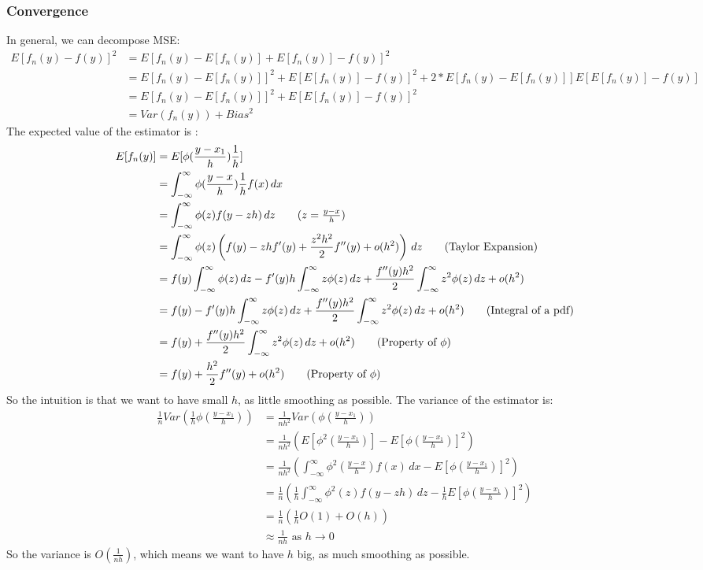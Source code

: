 \subsubsection{Convergence}
In general, we can decompose MSE: 
    \begin{align*}
        E[f_n(y) - f(y)]^2 
        & = E\left[f_n(y) - E[f_n(y)] + E[f_n(y)] - f(y)\right]^2 \\
        & = E[f_n(y) - E[f_n(y)]]^2 + E[E[f_n(y)] - f(y)]^2 + 2 * E[f_n(y) - E[f_n(y)]] E[E[f_n(y)] - f(y)] \\
        & = E[f_n(y) - E[f_n(y)]]^2 + E[E[f_n(y)] - f(y)]^2 \\
        & = Var(f_n(y)) + Bias^2
    \end{align*}
The expected value of the estimator is : 
    \begin{align*}
        E[f_n(y)] 
        & = E[\phi(\frac{y - x_1}{h}) \frac{1}{h}]\\
        & = \int_{-\infty}^\infty \phi(\frac{y-x}{h}) \frac{1}{h} f(x) \, dx \\
        & = \int_{-\infty}^\infty \phi(z) f(y-zh) \, dz \tag{$z = \frac{y-x}{h}$} \\
        & = \int_{-\infty}^\infty \phi(z)\left( f(y) - zh f'(y) + \frac{z^2 h^2}{2} f''(y) + o(h^2) \right) \, dz \tag{Taylor Expansion} \\
        & = f(y) \int_{-\infty}^\infty \phi(z) \, dz - f'(y)h\int_{-\infty}^\infty z \phi(z) \, dz + \frac{f''(y)h^2}{2}\int_{-\infty}^\infty z^2 \phi(z) \, dz + o(h^2) \\
        & = f(y) - f'(y)h\int_{-\infty}^\infty z \phi(z) \, dz + \frac{f''(y)h^2}{2}\int_{-\infty}^\infty z^2 \phi(z) \, dz + o(h^2)  \tag{Integral of a pdf}\\
        & = f(y) + \frac{f''(y)h^2}{2}\int_{-\infty}^\infty z^2 \phi(z) \, dz + o(h^2) \tag{Property of $\phi$} \\
        & = f(y) + \frac{h^2}{2}f''(y) + o(h^2) \tag{Property of $\phi$} \\
    \end{align*}
So the intuition is that we want to have small $h$, as little smoothing as possible. The variance of the estimator is: 
    \begin{align*}
        \frac{1}{n} Var\left(\frac{1}{h} \phi(\frac{y-x_1}{h}) \right) 
        & = \frac{1}{nh^2} Var\left(\phi(\frac{y-x_1}{h}) \right)\\
        & = \frac{1}{nh^2} \left(E[\phi^2(\frac{y-x_1}{h})] - E[\phi(\frac{y-x_1}{h})]^2 \right) \\
        & = \frac{1}{nh^2} \left(\int_{-\infty}^\infty \phi^2(\frac{y-x}{h}) f(x) \, dx - E[\phi(\frac{y-x_1}{h})]^2 \right)\\
        & = \frac{1}{n} \left( \frac{1}{h}\int_{-\infty}^\infty \phi^2(z) f(y-zh) \, dz - \frac{1}{h}E[\phi(\frac{y-x_1}{h})]^2 \right)\\
        & = \frac{1}{n}(\frac{1}{h} O(1) + O(h)) \\
        & \approx \frac{1}{nh} \text{ as } h \to 0
    \end{align*}
So the variance is $O(\frac{1}{nh})$, which means we want to have $h$ big, as much smoothing as possible. 

